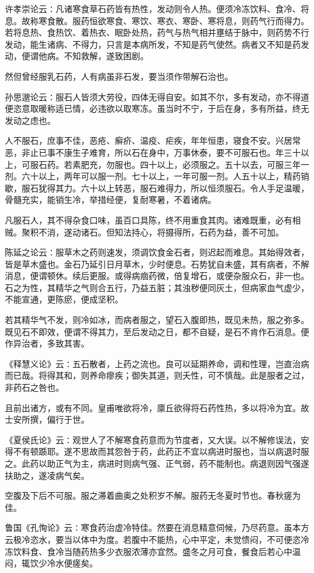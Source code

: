 \documentclass[a4paper,12pt,UTF8,twoside]{ctexbook}
\begin{document}
许孝崇论云∶凡诸寒食草石药皆有热性，发动则令人热。便须冷冻饮料、食冷、将息。故称寒食散。服药恒欲寒食、寒饮、寒衣、寒卧、寒将息，则药气行而得力。若将息热、食热饮、着热衣、眠卧处热，药气与热气相并壅结于脉中，则药势不行发动，能生诸病、不得力，只言是本病所发，不知是药气使然。病者又不知是药发动，便谓他病。不知救解，遂致困剧。

然但曾经服乳石药，人有病虽非石发，要当须作带解石治也。

孙思邈论云∶服石人皆须大劳役，四体无得自安。如其不尔，多有发动，亦不得道便恣意取暖称适已情，必违欲以取寒冻。虽当时不宁，于后在身，多有所益，终无发动之虑也。

人不服石，庶事不佳，恶疮、癣疥、温疫、疟疾，年年恒患，寝食不安。兴居常恶，非止已事不康生子难育，所以石在身中，万事休泰，要不可服石也。年三十以上，可服石药。若素肥充，勿服也。四十以上，必须服之。五十以去，可服三年一剂。六十以上，两年可以服一剂。七十以上，一年可服一剂。人五十以上，精药销歇，服石犹得其力。六十以上转恶，服石难得力，所以恒须服石。令人手足温暖，骨髓充实，能销生冷，举措经便，复耐寒暑，不着诸病。

凡服石人，其不得杂食口味，虽百口具陈，终不用重食其肉。诸难既重，必有相贼。聚积不消，遂动诸石。但知法持心，将摄得所，石药为益，善不可加。

陈延之论云∶服草木之药则速发，须调饮食金石者，则迟起而难息。其始得效者，皆是草木盛也。金石乃延引日月草木，少时便息。石势犹自未盛，其有病者，不解消息，便谓顿休。续后更服。或得病痼药微，倍复增石，或便杂服众石，非一也。石之为性，其精华之气则合五行，乃益五脏；其浊秽便同灰土，但病家血气虚少，不能宣通，更陈瘀，便成坚积。

若其精华气不发，则冷如冰，而病者服之，望石入腹即热，既见未热，服之弥多。既见石不即效，便谓不得其力，至后发动之日，都不自疑，是石不肯作石消息。便作异治者，多致其害。

《释慧义论》云∶五石散者，上药之流也。良可以延期养命，调和性理，岂直治病而已哉。将得其和，则养命瘳疾；御失其道，则夭性，可不慎哉。此是服者之过，非药石之咎也。

且前出诸方，或有不同。皇甫唯欲将冷，廪丘欲得将石药性热，多以将冷为宜。故士安所撰，偏行于世。

《夏侯氏论》云∶观世人了不解寒食药意而为节度者，又大误。以不解修误法，安得不有顿踬耶。遂不思故而其怨咎于药，此药正不宜以病进时服也，当以病退时服之。此药以助正气为主，病进时则病气强、正气弱，药不能制也。病退则因气强遂扶助之，遂凌病气矣。

空腹及下后不可服。服之滞着曲奥之处积岁不解。服药无冬夏时节也。春秋瘥为佳。

鲁国《孔恂论》云∶寒食药治虚冷特佳。然要在消息精意伺候，乃尽药意。虽本方云极冷恣水，要当以体中为度。若腹中不能热，心中平定，未觉愦闷，不可便恣冷冻饮料食、食冷当随药热多少衣服浓薄亦宜然。盛冬之月可食，餐食后若心中温闷，辄饮少冷水便瘥矣。
\end{document}
